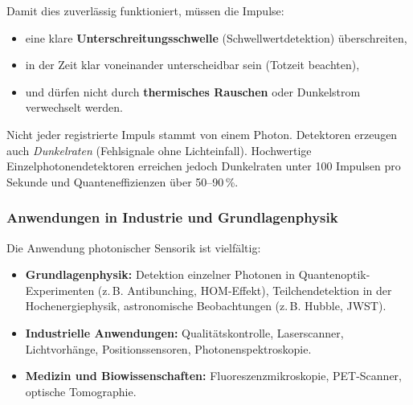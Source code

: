 Damit dies zuverlässig funktioniert, müssen die Impulse:
\begin{itemize}
	\item eine klare \textbf{Unterschreitungsschwelle} (Schwellwertdetektion) überschreiten,
	\item in der Zeit klar voneinander unterscheidbar sein (Totzeit beachten),
	\item und dürfen nicht durch \textbf{thermisches Rauschen} oder Dunkelstrom verwechselt werden.
\end{itemize}
\vspace{1em}
\begin{tcolorbox}[didaktikbox, title=Was zählt als Photon? ]
	\label{box:photonenzaehlung}
	\small
	Nicht jeder registrierte Impuls stammt von einem Photon. Detektoren erzeugen auch \emph{Dunkelraten} (Fehlsignale ohne Lichteinfall). Hochwertige Einzelphotonendetektoren erreichen jedoch Dunkelraten unter 100 Impulsen pro Sekunde und Quanteneffizienzen über 50–90\,\%.
\end{tcolorbox}

\subsubsection{Anwendungen in Industrie und Grundlagenphysik}

Die Anwendung photonischer Sensorik ist vielfältig:

\begin{itemize}
	\item \textbf{Grundlagenphysik:} Detektion einzelner Photonen in Quantenoptik-Experimenten (z.\,B. Antibunching, HOM-Effekt), Teilchendetektion in der Hochenergiephysik, astronomische Beobachtungen (z.\,B. Hubble, JWST).
	\item \textbf{Industrielle Anwendungen:} Qualitätskontrolle, Laserscanner, Lichtvorhänge, Positionssensoren, Photonenspektroskopie.
	\item \textbf{Medizin und Biowissenschaften:} Fluoreszenzmikroskopie, PET-Scanner, optische Tomographie.
\end{itemize}

